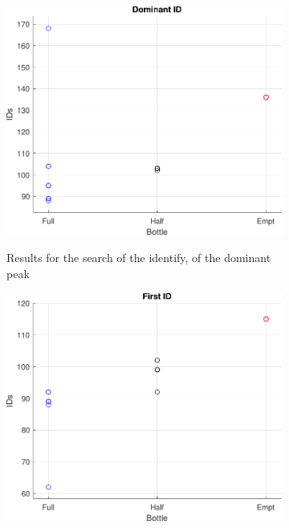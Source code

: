 \begin{figure}[]
    \centering
    \begin{subfigure}{0.45\textwidth}
        \centering
        \includegraphics[width=\linewidth]{Chapters/6CHP/Figures/ResultsuCGraphs/Sen/BotMidAcCiMa18_05domID.pdf}
        \caption{Results for the search of the identify, of the dominant peak}{}
        \label{subfig:domIDACCL}
    \end{subfigure}
    \begin{subfigure}{0.45\textwidth}
        \centering
        \includegraphics[width=\linewidth]{Chapters/6CHP/Figures/ResultsuCGraphs/Sen/BotMidAcCiMa18_05fID.pdf}

\end{subfigure}
\end{figure}
